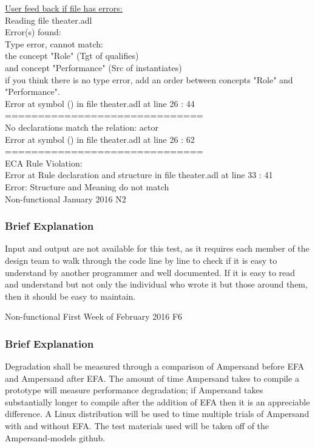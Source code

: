 \documentclass[12pt]{report}
\begin{document}
\noindent
\underline{User feed back if file has errors:} \\
Reading file theater.adl \\
Error(s) found:\\
Type error, cannot match:\\
the concept "Role" (Tgt of qualifies)\\
and concept "Performance" (Src of instantiates)\\
if you think there is no type error, add an order between concepts "Role" and 
"Performance".\\
Error at symbol () in file theater.adl at line 26 : 44 \\
============================== \\
No declarations match the relation: actor\\
Error at symbol () in file theater.adl at line 26 : 62\\
==============================\\
ECA Rule Violation: \\
Error at Rule declaration and structure in file theater.adl at line 33 : 41\\
Error: Structure and Meaning do not match\\

{Non-functional}
{January 2016}
{N2}
\vspace{-12pt}\subsubsection*{Brief Explanation}
Input and output are not available for this test, as it requires each member of 
the design team to walk through the code line by line to check if it is easy to 
understand by another programmer and well documented. If it is easy to read and 
understand but not only the individual who wrote it but those around them, then 
it should be easy to maintain. 


{Non-functional}
{First Week of February 2016 }
{F6}
\vspace{-12pt}\subsubsection*{Brief Explanation}
Degradation shall be measured through a comparison of Ampersand before EFA and 
Ampersand after EFA. The amount of time Ampersand takes to compile a prototype 
will measure performance degradation; if Ampersand takes substantially longer 
to compile after the addition of EFA then it is an appreciable difference. A 
Linux distribution will be used to time multiple trials of Ampersand with and 
without EFA. The test materials used will be taken off of the Ampersand-models 
github.
\end{document}
